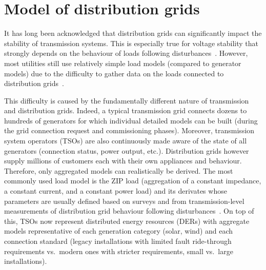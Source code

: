\chapter{Model of distribution grids}
\label{ch:distrib}
\minitoc

It has long been acknowledged that distribution grids can significantly impact the stability of transmission systems. This is especially true for voltage stability that strongly depends on the behaviour of loads following disturbances~\cite{CutsemBook, kundur}. However, most utilities still use relatively simple load models (\eg compared to generator models) due to the difficulty to gather data on the loads connected to distribution grids~\cite{IndustryLoadModel}.

This difficulty is caused by the fundamentally different nature of transmission and distribution grids. Indeed, a typical transmission grid connects dozens to hundreds of generators for which individual detailed models can be built (\eg during the grid connection request and commissioning phases). Moreover, transmission system operators (TSOs) are also continuously made aware of the state of all generators (connection status, power output, etc.). Distribution grids however supply millions of customers each with their own appliances and behaviour. Therefore, only aggregated models can realistically be derived. The most commonly used load model is the ZIP load (aggregation of a constant impedance, a constant current, and a constant power load) and its derivates whose parameters are usually defined based on surveys and from transmission-level measurements of distribution grid behaviour following disturbances~\cite{IndustryLoadModel}. On top of this, TSOs now represent distributed energy resources (DERs) with aggregate models representative of each generation category (solar, wind) and each connection standard (legacy installations with limited fault ride-through requirements vs.\ modern ones with stricter requirements, small vs.\ large installations).



